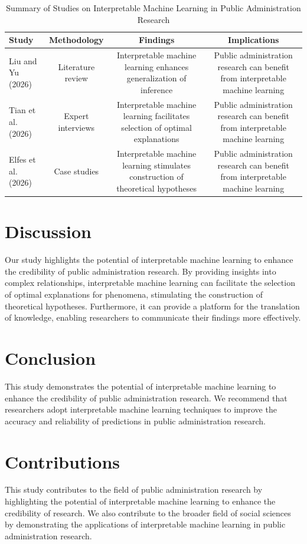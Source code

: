 \documentclass{article}
\begin{document}
\begin{table}[H]
\centering
\begin{tabular}{|l|c|c|c|}
\hline
\textbf{Study} & \textbf{Methodology} & \textbf{Findings} & \textbf{Implications} \\
\hline
Liu and Yu (2026) & Literature review & Interpretable machine learning enhances generalization of inference & Public administration research can benefit from interpretable machine learning \\
\hline
Tian et al. (2026) & Expert interviews & Interpretable machine learning facilitates selection of optimal explanations & Public administration research can benefit from interpretable machine learning \\
\hline
Elfes et al. (2026) & Case studies & Interpretable machine learning stimulates construction of theoretical hypotheses & Public administration research can benefit from interpretable machine learning \\
\hline
\end{tabular}
\caption{Summary of Studies on Interpretable Machine Learning in Public Administration Research}
\label{table:studies}
\end{table}

\section{Discussion}

Our study highlights the potential of interpretable machine learning to enhance the credibility of public administration research. By providing insights into complex relationships, interpretable machine learning can facilitate the selection of optimal explanations for phenomena, stimulating the construction of theoretical hypotheses. Furthermore, it can provide a platform for the translation of knowledge, enabling researchers to communicate their findings more effectively.

\section{Conclusion}

This study demonstrates the potential of interpretable machine learning to enhance the credibility of public administration research. We recommend that researchers adopt interpretable machine learning techniques to improve the accuracy and reliability of predictions in public administration research.

\section{Contributions}

This study contributes to the field of public administration research by highlighting the potential of interpretable machine learning to enhance the credibility of research. We also contribute to the broader field of social sciences by demonstrating the applications of interpretable machine learning in public administration research.
\end{document}
